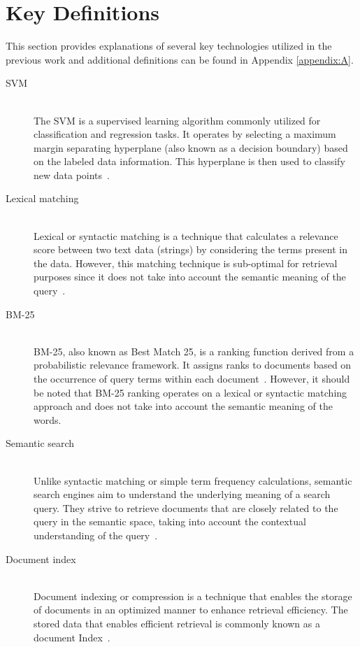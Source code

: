 \section{Key Definitions}

This section provides explanations of several key technologies utilized in the previous work and additional definitions can be found in Appendix \ref{appendix:A}.

\begin{description}
	
	\item[\ac{SVM}] \hfill \\ The \ac{SVM} is a supervised learning algorithm commonly utilized for classification and regression tasks. It operates by selecting a maximum margin separating hyperplane (also known as a decision boundary) based on the labeled data information. This hyperplane is then used to classify new data points~\cite{noble2006support}.
	
	\item[Lexical matching] \hfill \\ Lexical or syntactic matching is a technique that calculates a relevance score between two text data (strings) by considering the terms present in the data. However, this matching technique is sub-optimal for retrieval purposes since it does not take into account the semantic meaning of the query~\cite{kuzi2020leveraging}.
	
	\item[BM-25] \hfill \\ BM-25, also known as Best Match 25, is a ranking function derived from a probabilistic relevance framework. It assigns ranks to documents based on the occurrence of query terms within each document~\cite{amati_bm25_2009}. However, it should be noted that BM-25 ranking operates on a lexical or syntactic matching approach and does not take into account the semantic meaning of the words.
	
	\item[Semantic search] \hfill \\ Unlike syntactic matching or simple term frequency calculations, semantic search engines aim to understand the underlying meaning of a search query. They strive to retrieve documents that are closely related to the query in the semantic space, taking into account the contextual understanding of the query~\cite{dong2008survey}.
	
	\item[Document index] \hfill \\ Document indexing or compression is a technique that enables the storage of documents in an optimized manner to enhance retrieval efficiency. The stored data that enables efficient retrieval is commonly known as a document Index~\cite{ziviani2000compression}.
	

\end{description}
